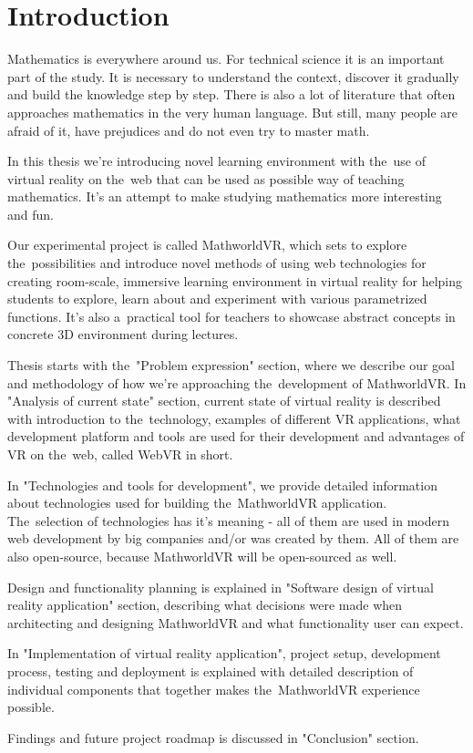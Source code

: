 \setcounter{page}{1}
\setcounter{equation}{0}
\setcounter{figure}{0}
\setcounter{table}{0}

\section*{Introduction}
Mathematics is everywhere around us. For technical science it is an important part of the study. It is necessary to understand the context, discover it gradually and build the knowledge step by step. There is also a lot of literature that often approaches mathematics in the very human language. But still, many people are afraid of it, have prejudices and do not even try to master math. 

In this thesis we're introducing novel learning environment with the~use of virtual reality on the~web that can be used as possible way of teaching mathematics. It's an attempt to make studying mathematics more interesting and fun.

Our experimental project is called MathworldVR, which sets to explore the~possibilities and introduce novel methods of using web technologies for creating room-scale, immersive learning environment in virtual reality for helping students to explore, learn about and experiment with various parametrized functions. It’s also a~practical tool for teachers to showcase abstract concepts in concrete 3D environment during lectures.

Thesis starts with the~"Problem expression" section, where we describe our goal and methodology of how we're approaching the~development of MathworldVR. In "Analysis of current state" section, current state of virtual reality is described with introduction to the~technology, examples of different VR applications, what development platform and tools are used for their development and advantages of VR on the~web, called WebVR in short.

In "Technologies and tools for development", we provide detailed information about technologies used for building the~MathworldVR application. The~selection of technologies has it's meaning - all of them are used in modern web development by big companies and/or was created by them. All of them are also open-source, because MathworldVR will be open-sourced as well.

Design and functionality planning is explained in "Software design of virtual reality application" section, describing what decisions were made when architecting and designing MathworldVR and what functionality user can expect.

In "Implementation of virtual reality application", project setup, development process, testing and deployment is explained with detailed description of individual components that together makes the~MathworldVR experience possible.

Findings and future project roadmap is discussed in "Conclusion" section.
